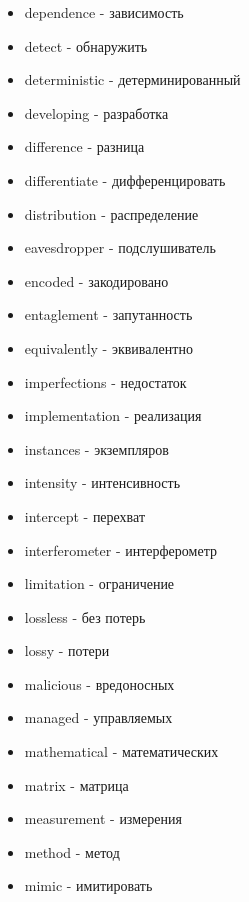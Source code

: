 \begin{multicols}{2}
\begin{itemize}
\item dependence - зависимость
\item detect - обнаружить

\item deterministic - детерминированный

\item developing - разработка

\item difference - разница

\item differentiate - дифференцировать

\item distribution - распределение

\item eavesdropper - подслушиватель

\item encoded - закодировано
\item entaglement - запутанность
\item equivalently - эквивалентно

\item imperfections - недостаток
\item implementation - реализация

\item instances - экземпляров

\item intensity - интенсивность
\item intercept - перехват

\item interferometer - интерферометр

\item limitation - ограничение

\item lossless - без потерь
\item lossy - потери

\item malicious - вредоносных
\item managed - управляемых

\item mathematical - математических
\item matrix - матрица

\item measurement - измерения

\item method - метод
\item mimic - имитировать


\end{itemize}
\end{multicols}
